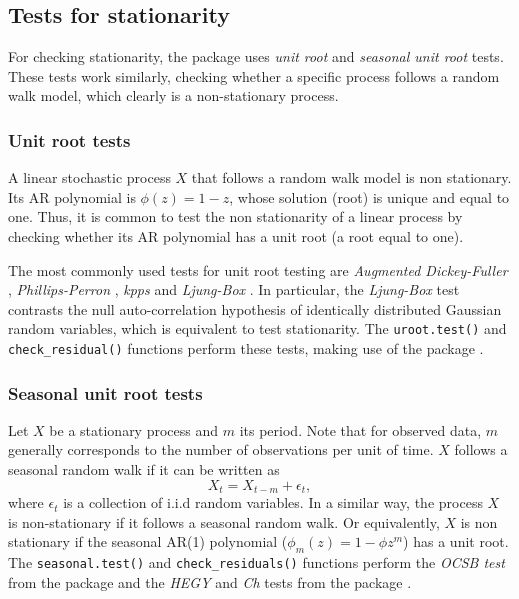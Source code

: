 \subsection{Tests for stationarity}\label{tests-for-stationarity}

For checking stationarity, the  package uses \textit{unit root} and \textit{seasonal unit root} tests. These tests work similarly, checking whether a specific process follows a random walk model, which clearly is a non-stationary process.

\subsubsection{Unit root tests}\label{unit-root-tests}

A linear stochastic process \(X\) that follows a random walk model is non stationary. Its AR polynomial is \(\phi(z) = 1 - z\), whose solution (root) is unique and equal to one. Thus, it is common to test the non stationarity of a linear process by checking whether its AR polynomial has a unit root (a root equal to one).

The most commonly used tests for unit root testing are \emph{Augmented Dickey-Fuller} \citep{dickey1984}, \emph{Phillips-Perron} \citep{Perron1988}, \emph{kpps} \citep{KppsI1992} and \textit{Ljung-Box} \citep{Box}. In particular, the \emph{Ljung-Box} test contrasts the null auto-correlation hypothesis of identically distributed Gaussian random variables, which is equivalent to test stationarity. The \texttt{uroot.test()} and \texttt{check\_residual()} functions perform these tests, making use of the  package \citep{tseries}.

\subsubsection{Seasonal unit root tests}\label{seasonal-unit-root-tests}

Let \(X\) be a stationary process and \(m\) its period. Note that for observed data, \(m\) generally corresponds to the number of observations per unit of time. \(X\) follows a seasonal random walk if it can be written as
\[
 X_t = X_{t-m} + \epsilon_t,
\]
where \(\epsilon_t\) is a collection of i.i.d random variables. In a similar way, the process \(X\) is non-stationary if it follows a seasonal random walk. Or equivalently, \(X\) is non stationary if the seasonal AR(1) polynomial (\(\phi_m(z) = 1 - \phi z^m\)) has a unit root. The \texttt{seasonal.test()} and \texttt{check\_residuals()} functions perform the \emph{OCSB test} \citep{ocsb1988} from the  package and the \emph{HEGY} \citep{Hegy1993} and \emph{Ch} \citep{ch1995} tests from the  package \citep{uroot}.


